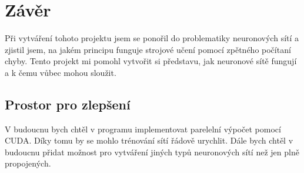 \section{Závěr}
Při vytváření tohoto projektu jsem se ponořil do problematiky neuronových sítí a zjistil jsem, na jakém principu funguje strojové učení pomocí zpětného počítaní chyby.
Tento projekt mi pomohl vytvořit si představu, jak neuronové sítě fungují a k čemu vůbec mohou sloužit.

\subsection{Prostor pro zlepšení}
V budoucnu bych chtěl v programu implementovat parelelní výpočet pomocí CUDA. Díky tomu by se mohlo trénování sítí řádově urychlit.
Dále bych chtěl v budoucnu přidat možnost pro vytváření jiných typů neuronových sítí než jen plně propojených.